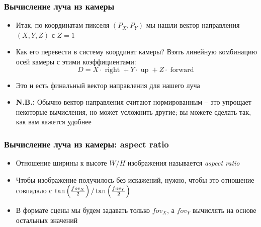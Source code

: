 \documentclass[10pt]{beamer}
\begin{document}
\begin{frame}
\frametitle{Вычисление луча из камеры}
\begin{itemize}
\item Итак, по координатам пикселя \begin{math}(P_X, P_Y)\end{math} мы нашли вектор направления \begin{math}(X, Y, Z)\end{math} с \begin{math}Z=1\end{math}
\pause
\item Как его перевести в систему координат камеры? \pause Взять линейную комбинацию осей камеры с этими коэффициентами:
\begin{equation}
D = X\cdot\operatorname{right}+Y\cdot\operatorname{up}+Z\cdot\operatorname{forward}
\end{equation}
\pause
\item Это и есть финальный вектор направления для нашего луча
\pause
\item \alert{\textbf{N.B.:}} Обычно вектор направления считают нормированным -- это упрощает некоторые вычисления, но может усложнить другие; вы можете сделать так, как вам кажется удобнее
\end{itemize}
\end{frame}

\begin{frame}
\frametitle{Вычисление луча из камеры: aspect ratio}
\begin{itemize}
\item Отношение ширины к высоте \begin{math}W / H\end{math} изображения называется \textit{aspect ratio}
\pause
\item Чтобы изображение получилось без искажений, нужно, чтобы это отношение совпадало с \begin{math}\tan\left({fov_X\over 2}\right) / \tan\left({fov_Y\over 2}\right)\end{math}
\pause
\item В формате сцены мы будем задавать только \begin{math}fov_X\end{math}, а \begin{math}fov_Y\end{math} вычислять на основе остальных значений
\end{itemize}
\end{frame}
\end{document}
